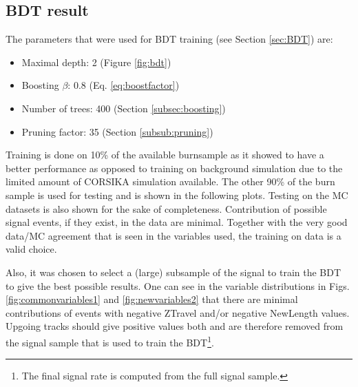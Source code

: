 \subsection{BDT result}
The parameters that were used for BDT training (see Section \ref{sec:BDT}) are:
\vspace{2mm}
\begin{itemize}
\item Maximal depth: 2 (Figure \ref{fig:bdt})
\item Boosting $\beta$: 0.8 (Eq. \ref{eq:boostfactor})
\item Number of trees: 400 (Section \ref{subsec:boosting})
\item Pruning factor: 35 (Section \ref{subsub:pruning})
\end{itemize}
\vspace{2mm}
\noindent Training is done on 10\% of the available burnsample as it showed to have a better performance as opposed to training on background simulation due to the limited amount of CORSIKA simulation available. The other 90\% of the burn sample is used for testing and is shown in the following plots. Testing on the MC datasets is also shown for the sake of completeness. Contribution of possible signal events, if they exist, in the data are minimal. Together with the very good data/MC agreement that is seen in the variables used, the training on data is a valid choice.

Also, it was chosen to select a (large) subsample of the signal to train the BDT to give the best possible results. One can see in the variable distributions in Figs. \ref{fig:commonvariables1} and \ref{fig:newvariables2} that there are minimal contributions of events with negative ZTravel and/or negative NewLength values. Upgoing tracks should give positive values both and are therefore removed from the signal sample that is used to train the BDT\footnote{The final signal rate is computed from the full signal sample.}.\\

